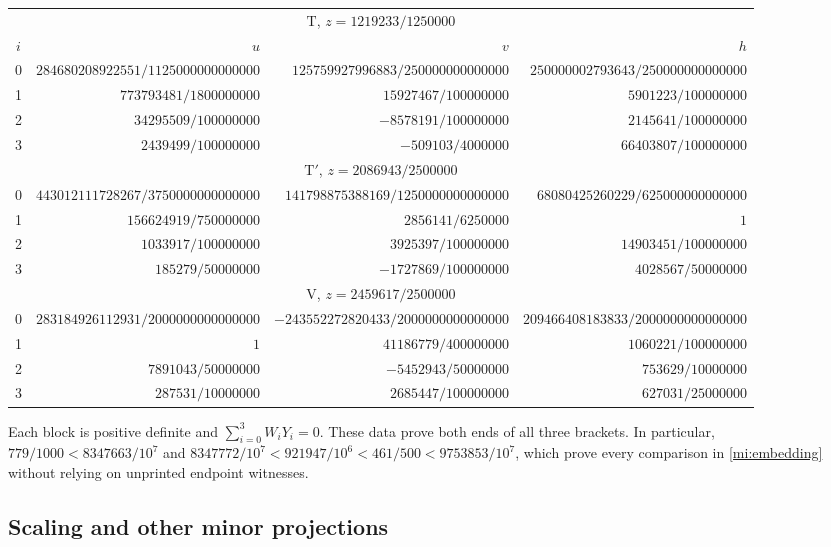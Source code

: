 \begin{center}\scriptsize
\begin{tabular}{c r r r}
\toprule
\multicolumn{4}{c}{$\mathrm T$, $z=1219233/1250000$}\\
$i$&$u$&$v$&$h$\\\midrule
0&$284680208922551/1125000000000000$&$125759927996883/250000000000000$&$250000002793643/250000000000000$\\
1&$773793481/1800000000$&$15927467/100000000$&$5901223/100000000$\\
2&$34295509/100000000$&$-8578191/100000000$&$2145641/100000000$\\
3&$2439499/100000000$&$-509103/4000000$&$66403807/100000000$\\\midrule
\multicolumn{4}{c}{$\mathrm T'$, $z=2086943/2500000$}\\
0&$443012111728267/3750000000000000$&$141798875388169/1250000000000000$&$68080425260229/625000000000000$\\
1&$156624919/750000000$&$2856141/6250000$&$1$\\
2&$1033917/100000000$&$3925397/100000000$&$14903451/100000000$\\
3&$185279/50000000$&$-1727869/100000000$&$4028567/50000000$\\\midrule
\multicolumn{4}{c}{$\mathrm V$, $z=2459617/2500000$}\\
0&$283184926112931/2000000000000000$&$-243552272820433/2000000000000000$&$209466408183833/2000000000000000$\\
1&$1$&$41186779/400000000$&$1060221/100000000$\\
2&$7891043/50000000$&$-5452943/50000000$&$753629/10000000$\\
3&$287531/10000000$&$2685447/100000000$&$627031/25000000$\\
\bottomrule
\end{tabular}
\end{center}
Each block is positive definite and $\sum_{i=0}^3W_iY_i=0$.
These data prove both ends of all three brackets.
In particular,
$779/1000<8347663/10^7$ and
$8347772/10^7<921947/10^6<461/500<9753853/10^7$,
which prove every comparison in \cref{mi:embedding} without relying on
unprinted endpoint witnesses.

\subsection{Scaling and other minor projections}


